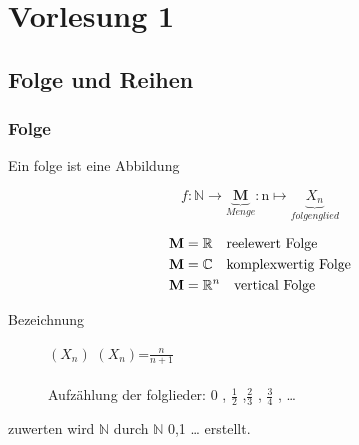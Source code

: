 \chapter{Vorlesung 1}
\section{Folge und Reihen}
\subsection{Folge}
\begin{definition}[Folgen]
    Ein folge ist eine Abbildung

    \[ f: \mathbb{N} \rightarrow \underbrace{\mathbf{M}}_{Menge} : \mathrm{n} \mapsto \underbrace{X_n}_{folgenglied} \]

\end{definition}
\begin{remark}

    \begin{align}	\mathbf{M} &= \mathbb{R} \quad \text{reelewert Folge} \notag \\
    \mathbf{M}&= \mathbb{C} \quad	\text{komplexwertig Folge}   \notag \\
    \mathbf{M}&= \mathbb{R}^n \quad \text{vertical Folge} \notag
    \end{align}




\end{remark}
\begin{description}

    \item[Bezeichnung]

    \quad $(X_n)$ \space {} \space $ \left( X_n   \right)$=$ \frac{n}{n+1} $
    \\ \\ Aufzählung der folglieder: 0 , $\frac{1}{2}$ ,$\frac{2}{3}$ , $\frac{3}{4}$ , \dots

\end{description}
\begin{remark}
    zuwerten wird $\mathbb{N}$ durch $\mathbb{N}$ {0,1 \dots} erstellt.


\end{remark}
